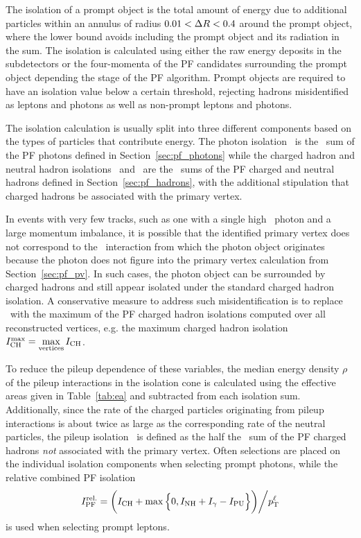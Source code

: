 The isolation of a prompt object is the total amount of energy due to additional particles within an annulus of radius $0.01 < \Delta R < 0.4$ around the prompt object, where the lower bound avoids including the prompt object and its radiation in the sum.
The isolation is calculated using either the raw energy deposits in the subdetectors or the four-momenta of the PF candidates surrounding the prompt object depending the stage of the PF algorithm.
Prompt objects are required to have an isolation value below a certain threshold, rejecting hadrons misidentified as leptons and photons as well as non-prompt leptons and photons.

The isolation calculation is usually split into three different components based on the types of particles that contribute energy.
The photon isolation \Ig\ is the \ET\ sum of the PF photons defined in Section~\ref{sec:pf_photons} while the charged hadron and neutral hadron isolations \ICH\ and \INH\ are the \pt\ sums of the PF charged and neutral hadrons defined in Section~\ref{sec:pf_hadrons}, with the additional stipulation that charged hadrons be associated with the primary vertex.

In events with very few tracks, such as one with a single high \pt\ photon and a large momentum imbalance, it is possible that the identified primary vertex does not correspond to the \Pp\Pp\ interaction from which the photon object originates because the photon does not figure into the primary vertex calculation from Section~\ref{sec:pf_pv}.
In such cases, the photon object can be surrounded by charged hadrons and still appear isolated under the standard charged hadron isolation.
A conservative measure to address such misidentification is to replace \ICH\ with the maximum of the PF charged hadron isolations computed over all reconstructed vertices, e.g. the maximum charged hadron isolation $I_{\text{CH}}^{\text{max}} = \max\limits_{\text{vertices}} I_{\text{CH}}$.

To reduce the pileup dependence of these variables, the median energy density $\rho$ of the pileup interactions in the isolation cone is calculated using the effective areas given in Table~\ref{tab:ea} and subtracted from each isolation sum.
Additionally, since the rate of the charged particles originating from pileup interactions is about twice as large as the corresponding rate of the neutral particles, the pileup isolation \IPU\ is defined as the half the \pt\ sum of the PF charged hadrons \textit{not} associated with the primary vertex.
Often selections are placed on the individual isolation components when selecting prompt photons, while the relative combined PF isolation
\begin{equation}
  I_{\text{PF}}^{\text{rel.}} = \bigg(I_{\text{CH}} + \max \Big\{0, I_{\text{NH}} + I_{\gamma} - I_{\text{PU}}\Big\}\bigg) \bigg/ p_{\mathrm{T}}^\ell
\end{equation}
is used when selecting prompt leptons.

